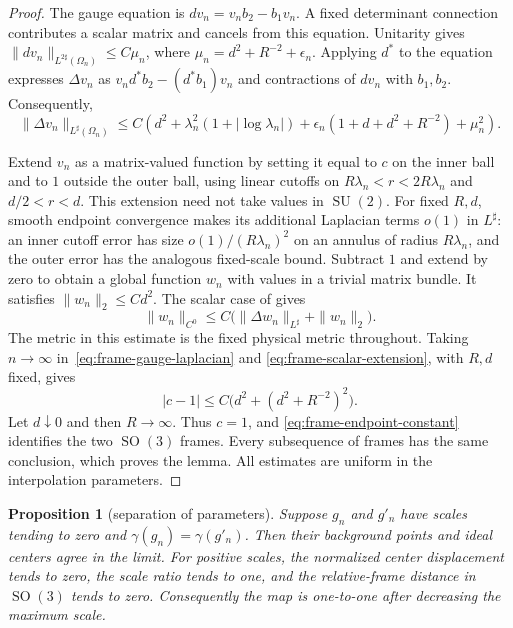 \documentclass[11pt]{amsart}
\newtheorem{proposition}[theorem]{Proposition}
\theoremstyle{definition}
\theoremstyle{remark}
\theoremstyle{plain}
\newcommand{\SO}{\operatorname{SO}}
\newcommand{\SU}{\operatorname{SU}}
\begin{document}
\begin{proof}
The gauge equation is $dv_n=v_nb_2-b_1v_n$.  A fixed determinant
connection contributes a scalar matrix and cancels from this equation.
Unitarity gives
$\|dv_n\|_{L^{2\sharp}(\Omega_n)}\leq C\mu_n$, where
$\mu_n=d^2+R^{-2}+\epsilon_n$.
Applying $d^*$ to the equation expresses $\Delta v_n$ as
$v_nd^*b_2-(d^*b_1)v_n$ and contractions of $dv_n$ with $b_1,b_2$.
Consequently,
\begin{equation}\label{eq:frame-gauge-laplacian}
 \|\Delta v_n\|_{L^\sharp(\Omega_n)}
 \leq C\left(d^2+\lambda_n^2(1+|\log\lambda_n|)
 +\epsilon_n(1+d+d^2+R^{-2})+\mu_n^2\right).
\end{equation}

Extend $v_n$ as a matrix-valued function by setting it equal to $c$
on the inner ball and to $1$ outside the outer ball, using linear
cutoffs on $R\lambda_n<r<2R\lambda_n$ and $d/2<r<d$.
This extension need not take values in $\SU(2)$.  For fixed $R,d$,
smooth endpoint convergence makes its additional Laplacian terms
$o(1)$ in $L^\sharp$: an inner cutoff error has size
$o(1)/(R\lambda_n)^2$ on an annulus of radius $R\lambda_n$, and the
outer error has the analogous fixed-scale bound.  Subtract $1$ and
extend by zero to obtain a global function $w_n$ with values in a
trivial matrix bundle.  It satisfies $\|w_n\|_2\leq Cd^2$.
The scalar case of \cite[Lemma~5.3(2)]{FeehanCritical} gives
\begin{equation}\label{eq:frame-scalar-extension}
 \|w_n\|_{C^0}\leq
 C\bigl(\|\Delta w_n\|_{L^\sharp}+\|w_n\|_2\bigr).
\end{equation}
The metric in this estimate is the fixed physical metric throughout.
Taking $n\to\infty$ in~\eqref{eq:frame-gauge-laplacian} and
\eqref{eq:frame-scalar-extension}, with $R,d$ fixed, gives
\[
 |c-1|\leq C\bigl(d^2+(d^2+R^{-2})^2\bigr).
\]
Let $d\downarrow0$ and then $R\to\infty$.  Thus $c=1$, and
\eqref{eq:frame-endpoint-constant} identifies the two $\SO(3)$ frames.
Every subsequence of frames has the same conclusion, which proves the
lemma.  All estimates are uniform in the interpolation parameters.
\end{proof}

\begin{proposition}[separation of parameters]\label{prop:separation}
Suppose $g_n$ and $g'_n$ have scales tending to zero and
$\gamma(g_n)=\gamma(g'_n)$.  Then their background points and
ideal centers agree in the limit.  For positive scales, the normalized
center displacement tends to zero, the scale ratio tends to one, and
the relative-frame distance in $\SO(3)$ tends to zero.  Consequently the map is
one-to-one after decreasing the maximum scale.
\end{proposition}
\end{document}
